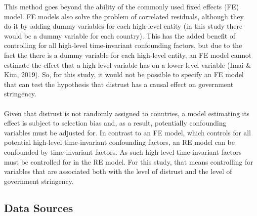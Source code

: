 \documentclass[
  12pt,
]{article}
\begin{document}
This method goes beyond the ability of the commonly used fixed effects (FE) model. FE models also solve the problem of correlated residuals, although they do it by adding dummy variables for each high-level entity (in this study there would be a dummy variable for each country). This has the added benefit of controlling for all high-level time-invariant confounding factors, but due to the fact the there is a dummy variable for each high-level entity, an FE model cannot estimate the effect that a high-level variable has on a lower-level variable (Imai \& Kim, 2019). So, for this study, it would not be possible to specify an FE model that can test the hypothesis that distrust has a causal effect on government stringency.\\
~\\
Given that distrust is not randomly assigned to countries, a model estimating its effect is subject to selection bias and, as a result, potentially confounding variables must be adjusted for. In contrast to an FE model, which controls for all potential high-level time-invariant confounding factors, an RE model can be confounded by time-invariant factors. As such high-level time-invariant factors must be controlled for in the RE model. For this study, that means controlling for variables that are associated both with the level of distrust and the level of government stringency.\\

\hypertarget{data-sources}{%
\subsection{Data Sources}\label{data-sources}}
\end{document}
